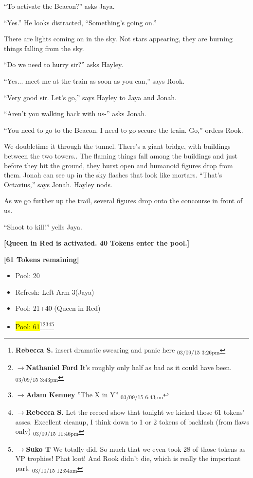 ``To activate the Beacon?'' asks Jaya.

``Yes.''  He looks distracted, ``Something's going on.''

There are lights coming on in the sky.  Not stars appearing, they are burning things falling from the sky.

``Do we need to hurry sir?'' asks Hayley.

``Yes... meet me at the train as soon as you can,'' says Rook.

``Very good sir.  Let's go,'' says Hayley to Jaya and Jonah.

``Aren't you walking back with us-'' asks Jonah.

``You need to go to the Beacon. I need to go secure the train.  Go,'' orders Rook.

We doubletime it through the tunnel. There's a giant bridge, with buildings between the two towers.. The flaming things fall among the buildings and just before they hit the ground, they burst open and humanoid figures drop from them.  Jonah can see up in the sky flashes that look like mortars.  ``That's Octavius,'' says Jonah.  Hayley nods.

As we go further up the trail, several figures drop onto the concourse in front of us.

``Shoot to kill!'' yells Jaya.





\textbf{{[}Queen in Red is activated.  40 Tokens enter the pool.{]}}



\textbf{{[}61 Tokens remaining{]}}





\begin{itemize}
\item Pool: 20
\end{itemize}

\begin{itemize}
\item Refresh: Left Arm 3(Jaya)
\item Pool: 21+40 (Queen in Red)
\item \hl{Pool: 61}\footnote{\textbf{Rebecca S. }insert dramatic swearing and panic here \textsubscript{03/09/15 3:26pm}}\footnote{$\rightarrow$\textbf{Nathaniel Ford }It's roughly only half as bad as it could have been. \textsubscript{03/09/15 3:43pm}}\footnote{$\rightarrow$\textbf{Adam Kenney }''The X in Y'' \textsubscript{03/09/15 6:43pm}}\footnote{$\rightarrow$\textbf{Rebecca S. }Let the record show that tonight we kicked those 61 tokens' asses.  Excellent cleanup, I think down to 1 or 2 tokens of backlash (from flaws only) \textsubscript{03/09/15 11:46pm}}\footnote{$\rightarrow$\textbf{Suko T }We totally did.  So much that we even took 28 of those tokens as VP trophies!  Phat loot!  And Rook didn't die, which is really the important part. \textsubscript{03/10/15 12:54am}}
\end{itemize}




